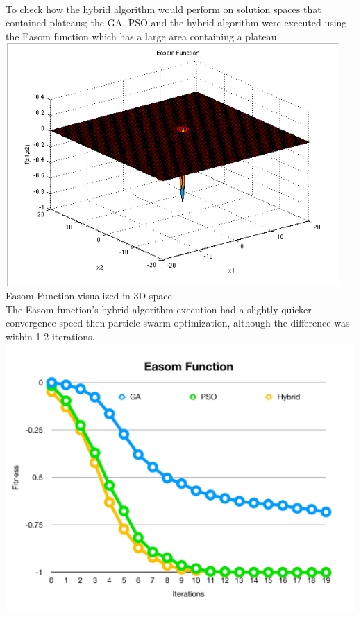 \documentclass[twocolumn]{article}
\begin{document}
\\
To check how the hybrid algorithm would perform on solution spaces that contained plateaus; the GA, PSO and the hybrid algorithm were executed using the Easom function which has a large area containing a plateau.
\\
\includegraphics[scale=0.43]{Images/Easomview.png} 
\\
Easom Function visualized in 3D space
\\
The Easom function’s hybrid algorithm execution had a slightly quicker convergence speed then particle swarm optimization, although the difference was within 1-2 iterations.
\\
\includegraphics[scale=0.40]{Images/Easom.png} 
\end{document}
